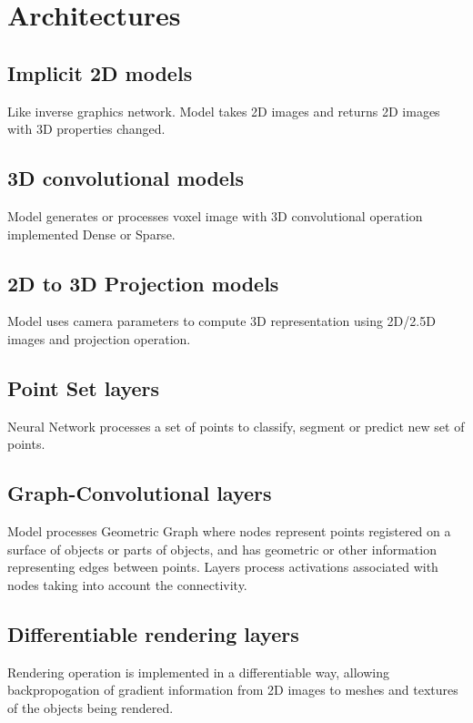 \section{Architectures}

\subsection{Implicit 2D models}

Like inverse graphics network. Model takes 2D images and returns 2D images with 3D properties changed. 

\subsection{3D convolutional models}

Model generates or processes voxel image with 3D convolutional operation implemented Dense or Sparse.

\subsection{2D to 3D Projection models}

Model uses camera parameters to compute 3D representation using 2D/2.5D images and projection operation.

\subsection{Point Set layers}

Neural Network processes a set of points to classify, segment or predict new set of points.

\subsection{Graph-Convolutional layers}

Model processes Geometric Graph where nodes represent points registered on a surface of objects or parts of objects, and has geometric or other information representing edges between points. Layers process activations associated with nodes taking into account the connectivity.

\subsection{Differentiable rendering layers}

Rendering operation is implemented in a differentiable way, allowing backpropogation of gradient information from 2D images to meshes and textures of the objects being rendered.

